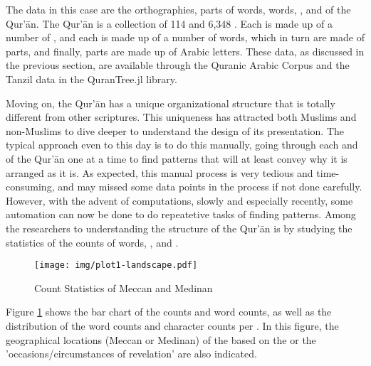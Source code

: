 The data in this case are the orthographies, parts of words, words,  , and   of the Qur'\=an. The Qur'\=an is a collection of 114   and 6,348  . Each   is made up of a number of  , and each   is made up of a number of words, which in turn are made of parts, and finally, parts are made up of Arabic letters. These data, as discussed in the previous section, are available through the Quranic Arabic Corpus and the Tanzil data in the QuranTree.jl library.

Moving on, the Qur'\=an has a unique organizational structure that is totally different from other scriptures. This uniqueness has attracted both Muslims and non-Muslims to dive deeper to understand the design of its presentation. The typical approach even to this day is to do this manually, going through each   and   of the Qur'\=an one at a time to find patterns that will at least convey why it is arranged as it is. As expected, this manual process is very tedious and time-consuming, and may missed some data points in the process if not done carefully. However, with the advent of computations, slowly and especially recently, some automation can now be done to do repeatetive tasks of finding patterns. Among the researchers to understanding the structure of the Qur'\=an is by studying the statistics of the counts of words,  , and  .

\begin{landscape}
\begin{figure}[!h]
    \centering
    \texttt{[image: img/plot1-landscape.pdf]}
    \caption{Count Statistics of Meccan and Medinan  }
    \label{fig:result_ayah_word_count}
\end{figure}
\end{landscape}

Figure \ref{fig:result_ayah_word_count} shows the bar chart of the   counts and word counts, as well as the distribution of the word counts and character counts per  . In this figure, the geographical locations (Meccan or Medinan) of the   based on the   or the 'occasions/circumstances of revelation' are also indicated.

